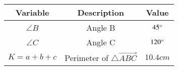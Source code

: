 \begin{tabular}[12pt]{ |c|c|c|}
    \hline
	\textbf{Variable} & \textbf{Description} & \textbf{Value}\\ 
    \hline
	$\angle B$ & Angle B & $45\degree$\\
    \hline 
	$\angle C$ & Angle C & $120\degree$\\
    \hline
    $K=a+b+c$ & Perimeter of $\triangle\vec{ABC}$ & $10.4cm$\\
    \hline
    \end{tabular}
